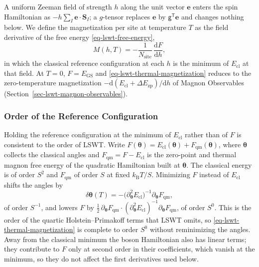 A uniform Zeeman field of strength \(h\) along the unit vector \(\mathbf e\) enters the spin Hamiltonian as \(-h\sum_I\mathbf e\cdot\mathbf S_I\); a \(g\)-tensor replaces \(\mathbf e\) by \(\mathsf g^{\mathsf T}\mathbf e\) and changes nothing below. We define the magnetization per site at temperature \(T\) as the field derivative of the free energy \eqref{eq-lswt-free-energy},
\begin{equation}\label{eq-lswt-thermal-magnetization}
M(h,T)=-\frac{1}{N_{\mathrm{site}}}\,\frac{\mathrm dF}{\mathrm dh},
\end{equation}
in which the classical reference configuration at each \(h\) is the minimum of \(E_{\mathrm{cl}}\) at that field. At \(T=0\), \(F=E_{\mathrm{GS}}\) and \eqref{eq-lswt-thermal-magnetization} reduces to the zero-temperature magnetization \(-\mathrm d(E_{\mathrm{cl}}+\Delta E_{\mathrm{zp}})/\mathrm dh\) of Magnon Observables (Section~\ref{sec-lswt-magnon-observables}).

\subsubsection{Order of the Reference Configuration}

Holding the reference configuration at the minimum of \(E_{\mathrm{cl}}\) rather than of \(F\) is consistent to the order of LSWT. Write \(F(\boldsymbol\theta)=E_{\mathrm{cl}}(\boldsymbol\theta)+F_{\mathrm{qm}}(\boldsymbol\theta)\), where \(\boldsymbol\theta\) collects the classical angles and \(F_{\mathrm{qm}}=F-E_{\mathrm{cl}}\) is the zero-point and thermal magnon free energy of the quadratic Hamiltonian built at \(\boldsymbol\theta\). The classical energy is of order \(S^2\) and \(F_{\mathrm{qm}}\) of order \(S\) at fixed \(k_{\mathrm B}T/S\). Minimizing \(F\) instead of \(E_{\mathrm{cl}}\) shifts the angles by
\begin{equation}\label{eq-lswt-thermal-angle-shift}
\delta\boldsymbol\theta(T)=-\big(\partial_{\boldsymbol\theta}^2E_{\mathrm{cl}}\big)^{-1}\partial_{\boldsymbol\theta}F_{\mathrm{qm}},
\end{equation}
of order \(S^{-1}\), and lowers \(F\) by \(\tfrac12\,\partial_{\boldsymbol\theta}F_{\mathrm{qm}}\cdot(\partial_{\boldsymbol\theta}^2E_{\mathrm{cl}})^{-1}\partial_{\boldsymbol\theta}F_{\mathrm{qm}}\), of order \(S^0\). This is the order of the quartic Holstein--Primakoff terms that LSWT omits, so \eqref{eq-lswt-thermal-magnetization} is complete to order \(S^0\) without reminimizing the angles. Away from the classical minimum the boson Hamiltonian also has linear terms; they contribute to \(F\) only at second order in their coefficients, which vanish at the minimum, so they do not affect the first derivatives used below.

